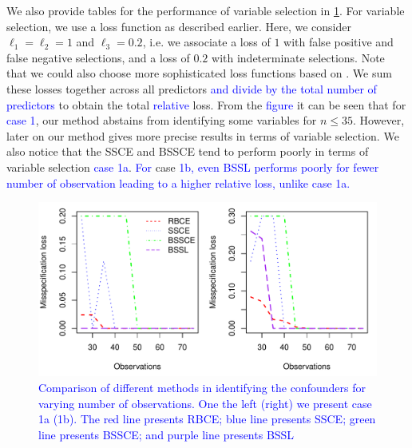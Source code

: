 \documentclass[preprint,12pt]{elsarticle}
\newcommand{\added}[1]{\textcolor{blue}{#1}}
\begin{document}
We also provide tables for the performance of variable selection in \cref{fig:comp:loss:obs}.
For variable selection, we use a loss function as described earlier.
Here, we consider
$\ell_1=\ell_2=1$ and $\ell_3= 0.2$,
i.e. we associate a loss of $1$ with false positive and false negative selections,
and a loss of $0.2$ with indeterminate selections.
Note that we could also choose more 
sophisticated loss functions based on \citep{ZAFFALON20121282}.
We sum these losses together across all predictors
\added{and divide by the total number of predictors} to obtain the total \added{relative} loss.
From the \added{figure} it can be seen that for \added{case 1}, our method
abstains from identifying some variables for 
$n \le 35$. However,
later on our method gives more precise results in terms of variable
selection. We also notice that the SSCE and BSSCE tend to perform poorly
in terms of variable selection \added{case 1a}. \added{For} case 
\added{1b, even BSSL performs poorly for fewer number of observation leading to a higher relative loss, unlike case 1a.} 

\begin{figure}
	\centering
	\includegraphics[width = 0.95\linewidth]{loss_obs.pdf}
	\caption{\added{Comparison of different methods in identifying the confounders for varying number of observations. One the left (right) we present case 1a (1b). The red line presents RBCE; blue line presents SSCE; green line presents BSSCE; and purple line
	presents BSSL}}
	\label{fig:comp:loss:obs}
\end{figure}
\end{document}
